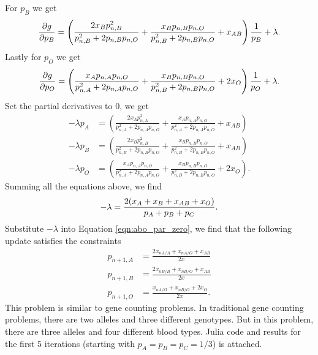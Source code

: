 \documentclass{scrartcl}
\begin{document}
For $p_B$ we get
\begin{equation}
	\begin{split}
	{\partial g \over \partial p_B}
	= \left( \frac{2 x_B p_{n,B}^2}{p_{n,B}^2 + 2p_{n,B}p_{n,O}}
	+ \frac{ x_B p_{n,B}p_{n,O}}{p_{n,B}^2 + 2p_{n,B}p_{n,O}}
	+ x_{AB} \right) {1 \over p_B} + \lambda .
	\end{split}
\end{equation}
Lastly for $p_O$ we get
\begin{equation}
	\begin{split}
	{\partial g \over \partial p_O}
	= \left( \frac{ x_A p_{n,A}p_{n,O}}{p_{n,A}^2 + 2p_{n,A}p_{n,O}}
	+ \frac{ x_B p_{n,B}p_{n,O}}{p_{n,B}^2 + 2p_{n,B}p_{n,O}}
	+ 2 x_O \right) {1 \over p_O} + \lambda .
	\end{split}
\end{equation}
Set the partial derivatives to 0, we get
\begin{equation}
	\begin{split}
		-\lambda p_A & = \left( \frac{2 x_A p_{n,A}^2}{p_{n,A}^2 + 2p_{n,A}p_{n,O}}
					+ \frac{ x_A p_{n,A}p_{n,O}}{p_{n,A}^2 + 2p_{n,A}p_{n,O}}
					+ x_{AB} \right) \\
		-\lambda p_B & = \left( \frac{2 x_B p_{n,B}^2}{p_{n,B}^2 + 2p_{n,B}p_{n,O}}
					+ \frac{ x_B p_{n,B}p_{n,O}}{p_{n,B}^2 + 2p_{n,B}p_{n,O}}
					+ x_{AB} \right) \\
		-\lambda p_O & = \left( \frac{ x_A p_{n,A}p_{n,O}}{p_{n,A}^2 + 2p_{n,A}p_{n,O}}
					+ \frac{ x_B p_{n,B}p_{n,O}}{p_{n,B}^2 + 2p_{n,B}p_{n,O}}
					+ 2 x_O \right) .
		\label{eqn:abo_par_zero}
	\end{split}
\end{equation}
Summing all the equations above, we find
\begin{equation}
	-\lambda  = {2 (x_A + x_B + x_{AB} + x_{O}) \over p_A + p_B + p_C}.
\end{equation}
Substitute $-\lambda$ into Equation \eqref{eqn:abo_par_zero}, we find that the following update
satisfies the constraints
\begin{equation}
	\begin{split}
 		p_{n+1,A} & = \frac{2x_{nA/A}+x_{nA/O}+x_{AB}}{2x} \\
 		p_{n+1,B} & = \frac{2x_{nB/B}+x_{nB/O}+x_{AB}}{2x} \\
 		p_{n+1,O} & = \frac{x_{nA/O}+x_{nB/O}+2x_O}{2x} .
 	\end{split}
\end{equation}
This problem is similar to gene counting problems. In traditional gene counting problems, there are
two alleles and three different genotypes. But in this problem, there are three alleles and four
different blood types. Julia code and results for the first 5 iterations (starting with
$p_A = p_B = p_C = 1/3$) is attached.
\end{document}

